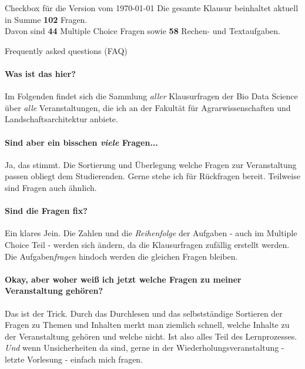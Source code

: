 \documentclass[a4paper, 10pt]{scrartcl}\usepackage[]{graphicx}\usepackage[]{xcolor}
\begin{document}
\begin{graybox}{Checkbox f{\"u}r die Version vom \today}
  \Large Die gesamte Klausur beinhaltet aktuell in Summe
  \textbf{102}
  Fragen.\\[1Ex]
  Davon sind \textbf{44} Multiple
  Choice Fragen sowie \textbf{58} Rechen- und
  Textaufgaben.
\end{graybox}

\vfill

\begin{takehomebox}{Frequently asked questions (FAQ)}
  \paragraph{Was ist das hier?} Im Folgenden findet sich die Sammlung
  \textit{aller} Klausurfragen der Bio Data Science {\"u}ber \textit{alle}
  Veranstaltungen, die ich an der Fakult{\"a}t f{\"u}r Agrarwissenschaften und
  Landschaftsarchitektur anbiete.
  \vspace{1Ex}
  \paragraph{Sind aber ein bisschen \textit{viele} Fragen...} Ja, das
  stimmt. Die Sortierung und {\"U}berlegung welche Fragen zur Veranstaltung
  passen obliegt dem Studierenden. Gerne stehe ich f{\"u}r R{\"u}ckfragen
  bereit. Teilweise sind Fragen auch {\"a}hnlich.
  \vspace{1Ex}
  \paragraph{Sind die Fragen fix?} Ein klares Jein. Die Zahlen und die
  \textit{Reihenfolge} der Aufgaben - auch im Multiple Choice Teil - werden
  sich {\"a}ndern, da die Klausurfragen zuf{\"a}llig erstellt werden. Die
  Aufgaben\textit{fragen} hindoch werden die gleichen Fragen bleiben.
  \vspace{1Ex}
  \paragraph{Okay, aber woher wei{\ss} ich jetzt welche Fragen zu meiner
    Veranstaltung geh{\"o}ren?} Das ist der Trick. Durch das Durchlesen und das
  selbstst{\"a}ndige Sortieren der Fragen zu Themen und Inhalten merkt man
  ziemlich schnell, welche Inhalte zu der Veranstaltung geh{\"o}ren und welche
  nicht. Ist also alles Teil des Lernprozesses. \textit{Und} wenn
  Unsicherheiten da sind, gerne in der Wiederholungsveranstaltung - letzte
  Vorlesung - einfach mich fragen.
  \vspace{1Ex}

\end{takehomebox}
\end{document}
